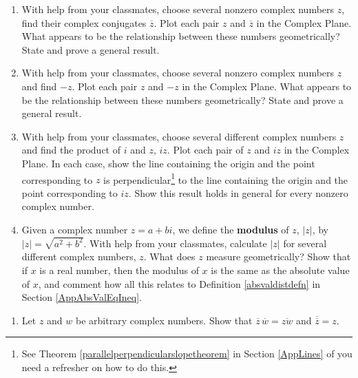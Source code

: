 \begin{enumerate}
\setcounter{enumi}{\value{HW}}

\item  \label{cmpgeoalgexfirst}  With help from your classmates, choose several nonzero complex numbers $z$, find their complex conjugates $\overline{z}$.  Plot each pair $z$ and $\overline{z}$ in the Complex Plane.  What appears to be the relationship between these numbers geometrically?  State and prove a general result.

\item    With help from your classmates, choose several nonzero complex numbers $z$ and  find $-z$.  Plot each pair $z$ and $-z$ in the Complex Plane.  What appears to be the relationship between these numbers geometrically?  State and prove a general result.

\item  With help from your classmates, choose several different complex numbers $z$ and find the product of $i$ and $z$,  $iz$.  Plot each pair of $z$ and $iz$ in the Complex Plane.  In each case, show the line containing the origin and the point corresponding to $z$ is perpendicular\footnote{See Theorem \ref{parallelperpendicularslopetheorem} in Section \ref{AppLines} of you need a refresher on how to do this.} to the line containing the origin and the point corresponding to $iz$.  Show this result holds in general for every nonzero complex number.

\item  \label{cmpgeoalgexlast} Given a complex number $z = a+bi$, we define the \textbf{modulus} of $z$, $|z|$, by $|z| = \sqrt{a^2+b^2}$.  With help from your classmates, calculate $|z|$ for several different complex numbers, $z$.  What does $z$ measure geometrically?  Show that if $x$ is a real number, then the modulus of $x$ is the same as the absolute value of $x$, and comment how all this relates to Definition \ref{absvaldistdefn} in Section \ref{AppAbsValEqIneq}.


\setcounter{HW}{\value{enumi}}
\end{enumerate}


\begin{enumerate}
\setcounter{enumi}{\value{HW}}

\item \label{zbarexercise} Let $z$ and $w$ be arbitrary complex numbers.  Show that  $\overline{z} \, \overline{w}  = \overline{zw}$ and $\overline{\overline{z}} = z$.

\setcounter{HW}{\value{enumi}}
\end{enumerate}

